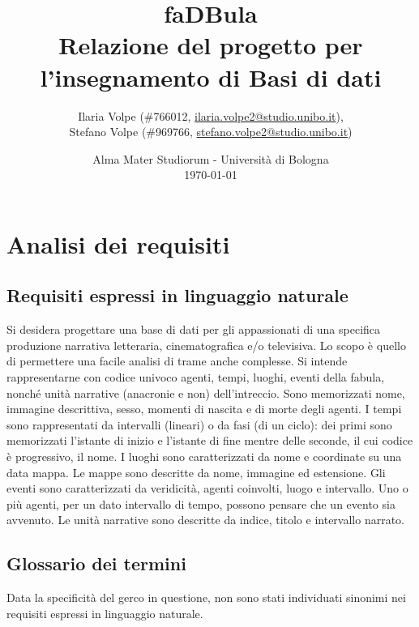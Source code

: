\documentclass{article}
\title{
	faDBula \\
	\textbf{\large
		Relazione del progetto per l'insegnamento di \break
		Basi di dati
	}
}
\author{
	Ilaria Volpe (\#766012,
	\href{mailto:ilaria.volpe2@studio.unibo.it}{ilaria.volpe2@studio.unibo.it}),
	\\
	Stefano Volpe (\#969766,
	\href{mailto:stefano.volpe2@studio.unibo.it}{stefano.volpe2@studio.unibo.it})
}
\date{
	Alma Mater Studiorum - Universit\`a di Bologna \\
	\today
}
\begin{document}
\maketitle
\thispagestyle{empty}
\pagebreak
\tableofcontents
\pagebreak
\section{Analisi dei requisiti}

\subsection{Requisiti espressi in linguaggio naturale}

Si desidera progettare una base di dati per gli appassionati di una specifica
produzione narrativa letteraria, cinematografica e/o televisiva. Lo scopo è
quello di permettere una facile analisi di trame anche complesse. Si intende
rappresentarne con codice univoco agenti, tempi, luoghi, eventi della fabula,
nonché unità narrative (anacronie e non) dell'intreccio. Sono memorizzati nome,
immagine descrittiva, sesso, momenti di nascita e di morte degli agenti. I
tempi sono rappresentati da intervalli (lineari) o da fasi (di un ciclo): dei
primi sono memorizzati l'istante di inizio e l'istante di fine mentre delle
seconde, il cui codice è progressivo, il nome. I luoghi sono caratterizzati da
nome e coordinate su una data mappa. Le mappe sono descritte da nome, immagine
ed estensione. Gli eventi sono caratterizzati da veridicità, agenti coinvolti,
luogo e intervallo. Uno o più agenti, per un dato intervallo di tempo, possono
pensare che un evento sia avvenuto. Le unità narrative sono descritte da indice,
titolo e intervallo narrato.

\subsection{Glossario dei termini}

Data la specificità del gerco in questione, non sono stati individuati sinonimi
nei requisiti espressi in linguaggio naturale.
\end{document}
